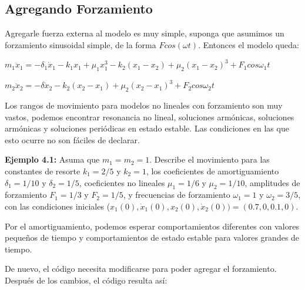 \documentclass[a4paper]{article}
\begin{document}
\begin{center}
\subsection{Agregando Forzamiento}
Agregarle fuerza externa al modelo es muy simple, suponga que asumimos un forzamiento sinusoidal simple, de la forma $F cos(\omega t)$. Entonces el modelo queda:
\begin{center}
$m_1\ddot x_1 = - \delta_1\dot x_1 - k_1x_1 + \mu_1x_1^3 - k_2(x_1 - x_2) + \mu_2(x_1 - x_2)^3 + F_1cos\omega_1t$

$m_2 \ddot x_2 = - \delta\dot x_2 - k_2(x_2 - x_1) + \mu_2(x_2 - x_1)^3 + F_2cos\omega_2t$
\end{center}

Los rangos de movimiento para modelos no lineales con forzamiento son muy vastos, podemos encontrar resonancia no lineal, soluciones armónicas, soluciones armónicas y soluciones periódicas en estado estable. Las condiciones en las que esto ocurre no son fáciles de declarar.

\smallskip
\textbf{Ejemplo 4.1:} Asuma que $m_1 = m_2 = 1$. Describe el movimiento para las constantes de resorte $k_1 = 2/5$ y $k_2 =1$, los coeficientes de amortiguamiento $\delta_1 = 1/10$ y $\delta_2 = 1/5$, coeficientes no lineales $\mu_1 = 1/6$ y $\mu_2 = 1/10$, amplitudes de forzamiento $F_1 = 1/3$ y $F_2 = 1/5$, y frecuencias de forzamiento $\omega_1 = 1$ y $\omega_2 = 3/5$, con las condiciones iniciales ($x_1(0), \dot x_1(0), x_2(0), \dot x_2(0)) = (0.7,0,0.1,0)$.

Por el amortiguamiento, podemos esperar comportamientos diferentes con valores pequeños de tiempo y comportamientos de estado estable para valores grandes de tiempo. 
\smallskip

De nuevo, el código necesita modificarse para poder agregar el forzamiento. Después de los cambios, el código resulta así:


\end{center}
\end{document}
